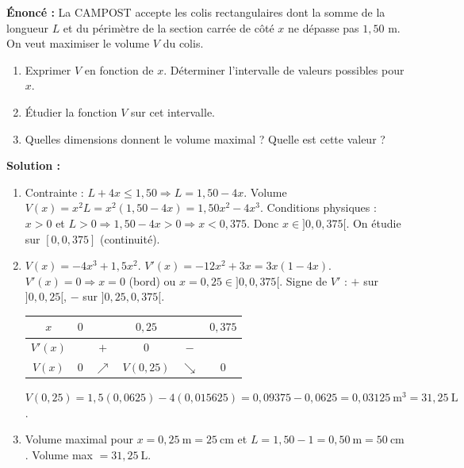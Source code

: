 \documentclass[11pt]{article}
\begin{document}
\begin{exoresolu}
\textbf{Énoncé :} La CAMPOST accepte les colis rectangulaires dont la somme de la longueur $L$ et du périmètre de la section carrée de côté $x$ ne dépasse pas $1,50$ m. On veut maximiser le volume $V$ du colis.
\begin{enumerate}
  \item Exprimer $V$ en fonction de $x$. Déterminer l'intervalle de valeurs possibles pour $x$.
  \item Étudier la fonction $V$ sur cet intervalle.
  \item Quelles dimensions donnent le volume maximal ? Quelle est cette valeur ?
\end{enumerate}
\tcblower
\textbf{Solution :}
\begin{enumerate}
  \item Contrainte : $L + 4x \leq 1,50 \Rightarrow L = 1,50 - 4x$.
  Volume $V(x) = x^2 L = x^2(1,50 - 4x) = 1,50 x^2 - 4x^3$.
  Conditions physiques : $x > 0$ et $L > 0 \Rightarrow 1,50 - 4x > 0 \Rightarrow x < 0,375$.
  Donc $x \in ]0, 0,375[$. On étudie sur $[0, 0,375]$ (continuité).
  \item $V(x) = -4x^3 + 1,5x^2$. $V'(x) = -12x^2 + 3x = 3x(1 - 4x)$.
  $V'(x)=0 \Rightarrow x=0$ (bord) ou $x=0,25 \in ]0, 0,375[$.
  Signe de $V'$ : $+$ sur $]0, 0,25[$, $-$ sur $]0,25, 0,375[$.
  \begin{center}
  \begin{tabular}{|c|ccccc|}\hline
  $x$ & $0$ & & $0,25$ & & $0,375$ \\ \hline
  $V'(x)$ & & $+$ & $0$ & $-$ & \\ \hline
  $V(x)$ & $0$ & $\nearrow$ & $V(0,25)$ & $\searrow$ & $0$ \\ \hline
  \end{tabular}
  \end{center}
  $V(0,25) = 1,5(0,0625) - 4(0,015625) = 0,09375 - 0,0625 = 0,03125\ \text{m}^3 = 31,25\ \text{L}$.
  \item Volume maximal pour $x = 0,25\ \text{m} = 25\ \text{cm}$ et $L = 1,50 - 1 = 0,50\ \text{m} = 50\ \text{cm}$.
  Volume max $= 31,25\ \text{L}$.
\end{enumerate}
\end{exoresolu}
\end{document}
